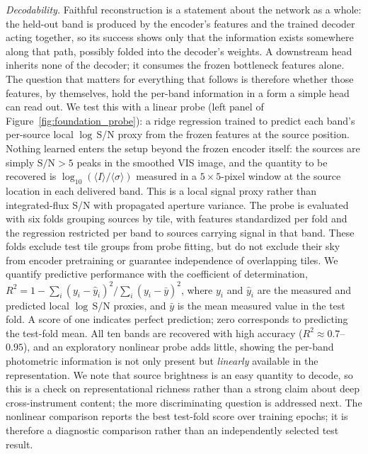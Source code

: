 \documentclass[twocolumn,linenumbers]{aastex701}
\begin{document}
\textit{Decodability.} Faithful reconstruction is a statement about the network as a whole: the held-out band is produced by the encoder's features and the trained decoder acting together, so its success shows only that the information exists somewhere along that path, possibly folded into the decoder's weights. A downstream head inherits none of the decoder; it consumes the frozen bottleneck features alone. The question that matters for everything that follows is therefore whether those features, by themselves, hold the per-band information in a form a simple head can read out. We test this with a linear probe (left panel of Figure~\ref{fig:foundation_probe}): a ridge regression trained to predict each band's per-source local $\log$\,S/N proxy from the frozen features at the source position. Nothing learned enters the setup beyond the frozen encoder itself: the sources are simply $\mathrm{S/N}>5$ peaks in the smoothed VIS image, and the quantity to be recovered is $\log_{10}(\langle I\rangle/\langle\sigma\rangle)$ measured in a $5\times5$-pixel window at the source location in each delivered band. This is a local signal proxy rather than integrated-flux S/N with propagated aperture variance. The probe is evaluated with six folds grouping sources by tile, with features standardized per fold and the regression restricted per band to sources carrying signal in that band. These folds exclude test tile groups from probe fitting, but do not exclude their sky from encoder pretraining or guarantee independence of overlapping tiles. We quantify predictive performance with the coefficient of determination, $R^2=1-\sum_i(y_i-\hat y_i)^2/\sum_i(y_i-\bar y)^2$, where $y_i$ and $\hat y_i$ are the measured and predicted local $\log$\,S/N proxies, and $\bar y$ is the mean measured value in the test fold. A score of one indicates perfect prediction; zero corresponds to predicting the test-fold mean. All ten bands are recovered with high accuracy ($R^2 \approx 0.7$--$0.95$), and an exploratory nonlinear probe adds little, showing the per-band photometric information is not only present but \emph{linearly} available in the representation. We note that source brightness is an easy quantity to decode, so this is a check on representational richness rather than a strong claim about deep cross-instrument content; the more discriminating question is addressed next. The nonlinear comparison reports the best test-fold score over training epochs; it is therefore a diagnostic comparison rather than an independently selected test result.
\end{document}
